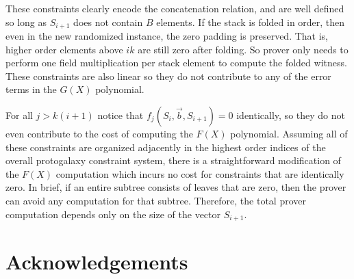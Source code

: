 \documentclass[11pt]{article} %
\begin{document}
These constraints clearly encode the concatenation relation, and are well defined so long as $S_{i+1}$ does not contain $B$ elements.
If the stack is folded in order, then even in the new randomized instance, the zero padding is preserved.
That is, higher order elements above $i k$ are still zero after folding.
So prover only needs to perform one field multiplication per stack element to compute the folded witness.
These constraints are also linear so they do not contribute to any of the error terms in the $G(X)$ polynomial.

For all $j > k (i+1)$ notice that $f_j(S_i, \vec{b}, S_{i+1}) = 0$ identically, so they do not even contribute to the cost of computing the $F(X)$ polynomial.
Assuming all of these constraints are organized adjacently in the highest order indices of the overall protogalaxy constraint system, there is a straightforward modification of the $F(X)$ computation which incurs no cost for constraints that are identically zero.
In brief, if an entire subtree consists of leaves that are zero, then the prover can avoid any computation for that subtree.
Therefore, the total prover computation depends only on the size of the vector $S_{i+1}$.



\section*{Acknowledgements}


\end{document}
